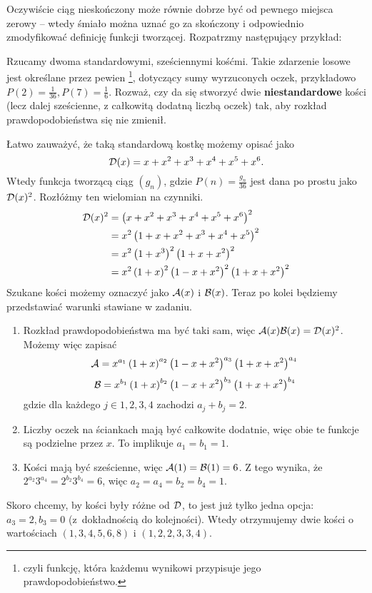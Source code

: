\documentclass{scrartcl}
\begin{document}
    Oczywiście ciąg nieskończony może równie dobrze być od pewnego miejsca zerowy -- wtedy śmiało można uznać go za skończony i odpowiednio zmodyfikować definicję funkcji tworzącej. Rozpatrzmy następujący przykład:
    \begin{example}
        Rzucamy dwoma standardowymi, sześciennymi kośćmi. Takie zdarzenie losowe jest określane przez pewien \footnote{czyli funkcję, która każdemu wynikowi przypisuje jego prawdopodobieństwo.}, dotyczący sumy wyrzuconych oczek, przykładowo $P(2) = \frac{1}{36}, P(7) = \frac{1}{6}$. Rozważ, czy da się stworzyć dwie \textbf{niestandardowe} kości (lecz dalej sześcienne, z całkowitą dodatną liczbą oczek) tak, aby rozkład prawdopodobieństwa się nie zmienił.
    \end{example}
    \begin{solution}
        Łatwo zauważyć, że taką standardową kostkę możemy opisać jako
        $$ \mathcal D(x) = x + x^2 + x^3 + x^4 + x^5 + x^6. $$
        Wtedy funkcja tworzącą ciąg $(g_n)$, gdzie $P(n) = \frac{g_n}{36}$ jest dana po prostu jako $\mathcal D(x)^2$. Rozłóżmy ten wielomian na czynniki.
        \begin{align*}
            \mathcal D(x)^2 &= \left(x + x^2 + x^3 + x^4 + x^5 + x^6\right)^2 \\
                    &= x^2\left(1 + x + x^2 + x^3 + x^4 + x^5\right)^2 \\
                    &= x^2\left(1 + x^3\right)^2\left(1 + x + x^2\right)^2 \\
                    &= x^2\left(1 + x\right)^2\left(1 - x + x^2\right)^2\left(1 + x + x^2\right)^2
        \end{align*}
        Szukane kości możemy oznaczyć jako $\mathcal A(x)$ i $\mathcal B(x)$. Teraz po kolei będziemy przedstawiać warunki stawiane w zadaniu.
        \begin{enumerate}
            \item Rozkład prawdopodobieństwa ma być taki sam, więc $\mathcal A(x)\mathcal B(x) = \mathcal D(x)^2$. Możemy więc zapisać
            $$ \mathcal A = x^{a_1}\left(1 + x\right)^{a_2}\left(1 - x + x^2\right)^{a_3}\left(1 + x + x^2\right)^{a_4} $$
            $$ \mathcal B = x^{b_1}\left(1 + x\right)^{b_2}\left(1 - x + x^2\right)^{b_3}\left(1 + x + x^2\right)^{b_4} $$
            gdzie dla każdego $j\in{1,2,3,4}$ zachodzi $a_j + b_j = 2$.
            \item Liczby oczek na ściankach mają być całkowite dodatnie, więc obie te funkcje są podzielne przez $x$. To implikuje $a_1 = b_1 = 1$.
            \item Kości mają być sześcienne, więc $\mathcal A(1) = \mathcal B(1) = 6$. Z tego wynika, że $2^{a_2}3^{a_4} = 2^{b_2}3^{b_4} = 6$, więc $a_2 = a_4 = b_2 = b_4 = 1$.
        \end{enumerate}
        Skoro chcemy, by kości były różne od $\mathcal D$, to jest już tylko jedna opcja: $a_3 = 2, b_3 = 0$ (z~dokładnością do kolejności). Wtedy otrzymujemy dwie kości o wartościach $(1, 3, 4, 5, 6, 8)$ i $(1, 2, 2, 3, 3, 4)$.
    \end{solution}
\end{document}
